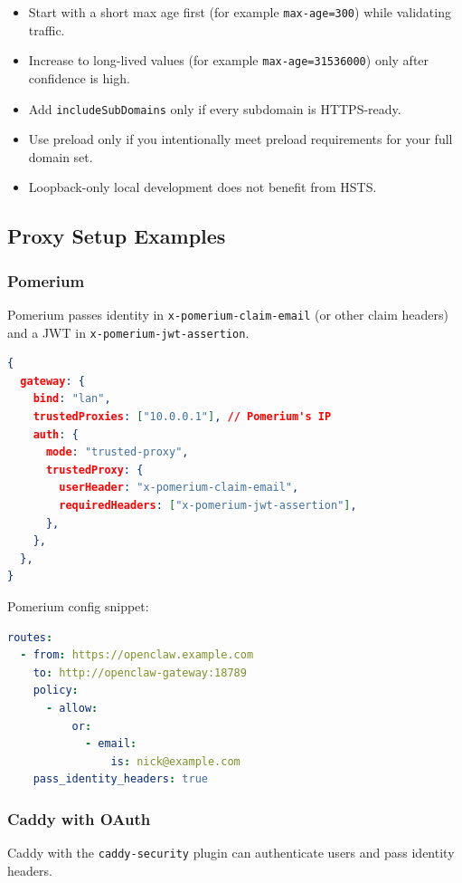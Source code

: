 \begin{itemize}
  \item Start with a short max age first (for example \texttt{max-age=300}) while validating traffic.
  \item Increase to long-lived values (for example \texttt{max-age=31536000}) only after confidence is high.
  \item Add \texttt{includeSubDomains} only if every subdomain is HTTPS-ready.
  \item Use preload only if you intentionally meet preload requirements for your full domain set.
  \item Loopback-only local development does not benefit from HSTS.
\end{itemize}


\subsection{Proxy Setup Examples}


\subsubsection{Pomerium}


Pomerium passes identity in \texttt{x-pomerium-claim-email} (or other claim headers) and a JWT in \texttt{x-pomerium-jwt-assertion}.

\begin{lstlisting}[language=json]
{
  gateway: {
    bind: "lan",
    trustedProxies: ["10.0.0.1"], // Pomerium's IP
    auth: {
      mode: "trusted-proxy",
      trustedProxy: {
        userHeader: "x-pomerium-claim-email",
        requiredHeaders: ["x-pomerium-jwt-assertion"],
      },
    },
  },
}
\end{lstlisting}


Pomerium config snippet:

\begin{lstlisting}[language=yaml]
routes:
  - from: https://openclaw.example.com
    to: http://openclaw-gateway:18789
    policy:
      - allow:
          or:
            - email:
                is: nick@example.com
    pass_identity_headers: true
\end{lstlisting}


\subsubsection{Caddy with OAuth}


Caddy with the \texttt{caddy-security} plugin can authenticate users and pass identity headers.

